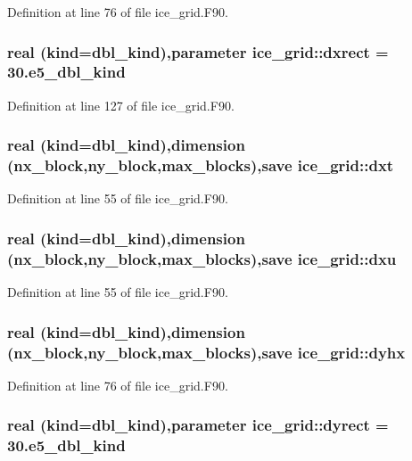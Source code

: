 Definition at line 76 of file ice\_\-grid.F90.\hypertarget{namespaceice__grid_aea53b08fccd72dbe7e8a4689ab26534c}{
\subsubsection[{dxrect}]{\setlength{\rightskip}{0pt plus 5cm}real (kind=dbl\_\-kind),parameter {\bf ice\_\-grid::dxrect} = 30.e5\_\-dbl\_\-kind}}
\label{namespaceice__grid_aea53b08fccd72dbe7e8a4689ab26534c}


Definition at line 127 of file ice\_\-grid.F90.\hypertarget{namespaceice__grid_a42016e793e21df58800428163f3eac13}{
\subsubsection[{dxt}]{\setlength{\rightskip}{0pt plus 5cm}real (kind=dbl\_\-kind),dimension (nx\_\-block,ny\_\-block,max\_\-blocks),save {\bf ice\_\-grid::dxt}}}
\label{namespaceice__grid_a42016e793e21df58800428163f3eac13}


Definition at line 55 of file ice\_\-grid.F90.\hypertarget{namespaceice__grid_a9fecdcb5623bfc308ef4f2ddb4d284b6}{
\subsubsection[{dxu}]{\setlength{\rightskip}{0pt plus 5cm}real (kind=dbl\_\-kind),dimension (nx\_\-block,ny\_\-block,max\_\-blocks),save {\bf ice\_\-grid::dxu}}}
\label{namespaceice__grid_a9fecdcb5623bfc308ef4f2ddb4d284b6}


Definition at line 55 of file ice\_\-grid.F90.\hypertarget{namespaceice__grid_ab6ee5703ec9bc808f8ebcf436960d722}{
\subsubsection[{dyhx}]{\setlength{\rightskip}{0pt plus 5cm}real (kind=dbl\_\-kind),dimension (nx\_\-block,ny\_\-block,max\_\-blocks),save {\bf ice\_\-grid::dyhx}}}
\label{namespaceice__grid_ab6ee5703ec9bc808f8ebcf436960d722}


Definition at line 76 of file ice\_\-grid.F90.\hypertarget{namespaceice__grid_a5c8fd584afc136dde0c222634c2fe240}{
\subsubsection[{dyrect}]{\setlength{\rightskip}{0pt plus 5cm}real (kind=dbl\_\-kind),parameter {\bf ice\_\-grid::dyrect} = 30.e5\_\-dbl\_\-kind}}
\label{namespaceice__grid_a5c8fd584afc136dde0c222634c2fe240}


